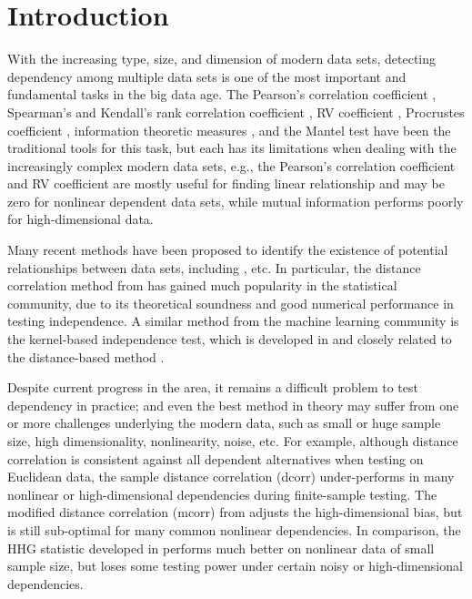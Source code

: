 \documentclass[11pt]{article}
\begin{document}
\clearpage
\tableofcontents


\newpage
{}

\section{Introduction}
\label{sec:intro}
With the increasing type, size, and dimension of modern data sets, detecting dependency among multiple data sets is one of the most important and fundamental tasks in the big data age. The Pearson's correlation coefficient \cite{Pearson1895}, Spearman's and Kendall's rank correlation coefficient \cite{KendallBook}, RV coefficient \cite{RobertEscoufier1976}, Procrustes coefficient \cite{GowerProcrustesBook}, information theoretic measures \cite{Renyi1959}, and the Mantel test \cite{Mantel1967} have been the traditional tools for this task, but each has its limitations when dealing with the increasingly complex modern data sets, e.g., the Pearson's correlation coefficient and RV coefficient are mostly useful for finding linear relationship and may be zero for nonlinear dependent data sets, while mutual information performs poorly for high-dimensional data. 

Many recent methods have been proposed to identify the existence of potential relationships between data sets, including \cite{Baringhaus2004,TaskinenOjaRandles2005, GrettonEtAl2005, SzekelyRizzoBakirov2007, GrettonGyorfi2010,Reshef2011, HellerGorfine2013, Reimherr2013, SzekelyRizzo2013a, SzekelyRizzo2013b, RizzoSzekely2016,HHG2016}, etc. In particular, the distance correlation method from \cite{SzekelyRizzoBakirov2007, SzekelyRizzo2009, SzekelyRizzo2013a, SzekelyRizzo2014} has gained much popularity in the statistical community, due to its theoretical soundness and good numerical performance in testing independence. A similar method from the machine learning community is the kernel-based independence test, which is developed in \cite{GrettonEtAl2005, GrettonGyorfi2010, GrettonEtAl2012} and closely related to the distance-based method \cite{SejdinovicEtAl2013, RamdasEtAl2015}.

Despite current progress in the area, it remains a difficult problem to test dependency in practice; and even the best method in theory may suffer from one or more challenges underlying the modern data, such as small or huge sample size, high dimensionality, nonlinearity, noise, etc. For example, although distance correlation is consistent against all dependent alternatives when testing on Euclidean data, the sample distance correlation (dcorr) under-performs in many nonlinear or high-dimensional dependencies during finite-sample testing. The modified distance correlation (mcorr) from \cite{SzekelyRizzo2013a} adjusts the high-dimensional bias, but is still sub-optimal for many common nonlinear dependencies. In comparison, the HHG statistic developed in \cite{HellerGorfine2013} performs much better on nonlinear data of small sample size, but loses some testing power under certain noisy or high-dimensional dependencies. 
\end{document}
